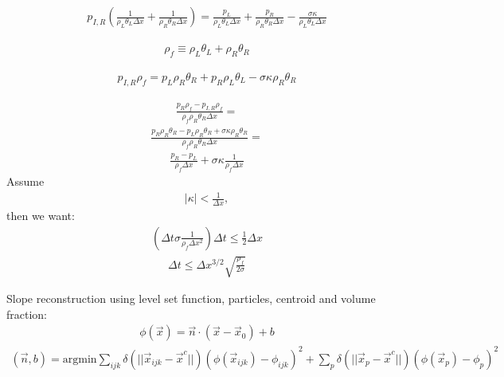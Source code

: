 \documentclass[preprint,12pt]{Definitions/elsarticle}
\begin{document}
\begin{enumerate}
\begin{eqnarray*}
p_{I,R}\left( 
\frac{1}{\rho_{L}\theta_{L}\Delta x}+
\frac{1}{\rho_{R}\theta_{R}\Delta x} \right)=
\frac{p_{L}}{\rho_{L}\theta_{L}\Delta x}+
\frac{p_{R}}{\rho_{R}\theta_{R}\Delta x}-
\frac{\sigma\kappa}{\rho_{L}\theta_{L}\Delta x}
\end{eqnarray*}

\begin{eqnarray*}
\rho_{f}\equiv \rho_{L}\theta_{L}+\rho_{R}\theta_{R}
\end{eqnarray*}

\begin{eqnarray*}
p_{I,R}\rho_{f}=
p_{L}\rho_{R}\theta_{R}+
p_{R}\rho_{L}\theta_{L}-\sigma\kappa\rho_{R}\theta_{R}
\end{eqnarray*}

\begin{eqnarray*}
\frac{p_{R}\rho_{f}-p_{I,R}\rho_{f}}{\rho_{f}\rho_{R}\theta_{R}\Delta x}=
\end{eqnarray*}
\begin{eqnarray*}
\frac{p_{R}\rho_{R}\theta_{R}-p_{L}\rho_{R}\theta_{R}+
 \sigma\kappa\rho_{R}\theta_{R}}{\rho_{f}\rho_{R}\theta_{R}\Delta x}=
\end{eqnarray*}
\begin{eqnarray*}
\frac{p_{R}-p_{L}}{\rho_{f}\Delta x}+\sigma\kappa\frac{1}{\rho_{f}\Delta x}
\end{eqnarray*}
Assume
\begin{eqnarray*}
|\kappa|<\frac{1}{\Delta x},
\end{eqnarray*}
then we want:
\begin{eqnarray*}
\left(\Delta t \sigma\frac{1}{\rho_{f}\Delta x^{2}}\right)\Delta t \le 
\frac{1}{2}\Delta x
\end{eqnarray*}
\begin{eqnarray*}
\Delta t \le \Delta x^{3/2} \sqrt{\frac{\rho_{f}}{2\sigma}}
\end{eqnarray*}

\par\noindent
Slope reconstruction using level set function, particles, centroid and
volume fraction:
\begin{eqnarray*}
 \phi(\vec{x})=\vec{n}\cdot(\vec{x}-\vec{x}_{0})+b
\end{eqnarray*}
\begin{eqnarray*}
(\vec{n},b)=\mbox{argmin}
 \sum_{ijk}\delta(||\vec{x}_{ijk}-\vec{x}^{c}||)
 (\phi(\vec{x}_{ijk})-\phi_{ijk})^{2}+
 \sum_{p}\delta(||\vec{x}_{p}-\vec{x}^{c}||)
 (\phi(\vec{x}_{p})-\phi_{p})^{2}
\end{eqnarray*}


\end{enumerate}
\end{document}
